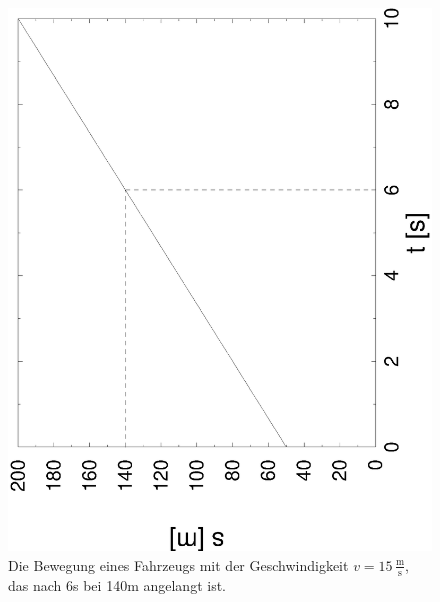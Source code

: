 \documentclass[%
11pt,%
twoside,%
titlepage,%
german,%
headsepline%
]{scrartcl}
\newcommand{\ufrac}[2]{\ensuremath{\,\frac{\mathrm{#1}}{\mathrm{#2}}}}
\begin{document}
{\begin{figure}[b!]
  \centering
  \includegraphics[angle=-90,width=\columnwidth]{pictures/fahrzeug.eps}
  \caption{Die Bewegung eines Fahrzeugs mit der Geschwindigkeit $v=15\ufrac{m}{s}$, das nach 6\unit{s} bei 140\unit{m} angelangt ist.}
  \label{fig:linfkt2:fahrzeug}
\end{figure}

}
\end{document}
